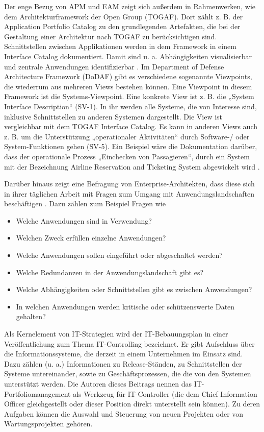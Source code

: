 Der enge Bezug von APM und EAM zeigt sich außerdem in Rahmenwerken, wie dem Architekturframework der Open Group (TOGAF). Dort zählt z. B. der Application Portfolio Catalog zu den grundlegenden Artefakten, die bei der Gestaltung einer Architektur nach TOGAF zu berücksichtigen sind. Schnittstellen zwischen Applikationen werden in dem Framework in einem Interface Catalog dokumentiert. Damit sind u. a. Abhängigkeiten visualisierbar und zentrale Anwendungen identifizierbar \cite[Kap. 31]{togaf}. Im Department of Defense Architecture Framework (DoDAF) gibt es verschiedene sogenannte Viewpoints, die wiederrum aus mehreren Views bestehen können. Eine Viewpoint in diesem Framework ist die Systems-Viewpoint. Eine konkrete View ist z. B. die „System Interface Description“ (SV-1). In ihr werden alle Systeme, die von Interesse sind, inklusive Schnittstellen zu anderen Systemen dargestellt. Die View ist vergleichbar mit dem TOGAF Interface Catalog. Es kann in anderen Views auch z. B. um die Unterstützung „operationaler Aktivitäten“ durch Software-/ oder System-Funktionen gehen (SV-5). Ein Beispiel wäre die Dokumentation darüber, dass der operationale Prozess „Einchecken von Passagieren“, durch ein System mit der Bezeichnung Airline Reservation and Ticketing System abgewickelt wird \cite[S. 311-344]{Rao}.

Darüber hinaus zeigt eine Befragung von Enterprise-Architekten, dass diese sich in ihrer täglichen Arbeit mit Fragen zum Umgang mit Anwendungslandschaften beschäftigen \cite{jung2}. Dazu zählen zum Beispiel Fragen wie 

\begin{itemize}
  \item Welche Anwendungen sind in Verwendung?
  \item Welchen Zweck erfüllen einzelne Anwendungen?
  \item Welche Anwendungen sollen eingeführt oder abgeschaltet werden?
  \item Welche Redundanzen in der Anwendungslandschaft gibt es?
  \item Welche Abhängigkeiten oder Schnittstellen gibt es zwischen Anwendungen?
  \item In welchen Anwendungen werden kritische oder schützenswerte Daten gehalten?
\end{itemize}

Als Kernelement von IT-Strategien wird der IT-Bebauungsplan in einer Veröffentlichung zum Thema IT-Controlling bezeichnet. Er gibt Aufschluss über die Informationssysteme, die derzeit in einem Unternehmen im Einsatz sind. Dazu zählen (u. a.) Informationen zu Release-Ständen, zu Schnittstellen der Systeme untereinander, sowie zu Geschäftsprozessen, die die von den Systemen unterstützt werden. \cite[S. 36]{gadatsch} Die Autoren dieses Beitrags nennen das IT-Portfoliomanagement als Werkzeug für IT-Controller (die dem Chief Information Officer gleichgestellt oder dieser Position direkt unterstellt sein können). Zu deren Aufgaben können die Auswahl und Steuerung von neuen Projekten oder von Wartungsprojekten gehören. \cite[S. 41-45]{gadatsch}

